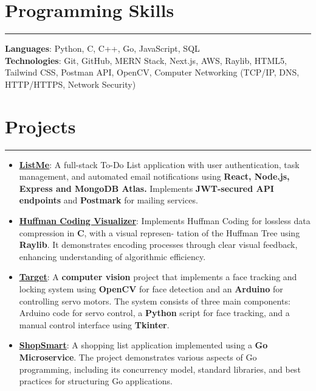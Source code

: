 \documentclass[a4paper,10.5pt]{article}
\begin{document}
\section*{Programming Skills}
\vspace{-.3em}
\hrule
\vspace{0.4em}

\textbf{Languages}: Python, C, C++, Go, JavaScript, SQL \vspace{0.3em} \\
\textbf{Technologies}: Git, GitHub, MERN Stack, Next.js, AWS, Raylib, HTML5, Tailwind CSS, Postman API, OpenCV, Computer Networking (TCP/IP, DNS, HTTP/HTTPS, Network Security) \vspace{0.3em}

\section*{Projects}
\vspace{-.3em}
\hrule
\vspace{0.4em}

\begin{itemize}
    \item \textbf{\href{https://github.com/thearfa99/mern}{\underline{ListMe}}}: A full-stack To-Do List application with user authentication, task management, and automated email notifications using \textbf{React, Node.js, Express and MongoDB Atlas.} Implements \textbf{JWT-secured API endpoints} and \textbf{Postmark} for mailing services.
    \item \textbf{\href{https://github.com/thearfa99/huft}{\underline{Huffman Coding Visualizer}}}: Implements Huffman Coding for lossless data compression in \textbf{C}, with a visual represen- tation of the Huffman Tree using \textbf{Raylib}. It demonstrates encoding processes through clear visual feedback, enhancing understanding of algorithmic efficiency.
    \item \textbf{\href{https://github.com/thearfa99/tureet}{\underline{Target}}}: A \textbf{computer vision} project that implements a face tracking and locking system using \textbf{OpenCV} for face detection and an \textbf{Arduino} for controlling servo motors. The system consists of three main components: Arduino code for servo control, a \textbf{Python} script for face tracking, and a manual control interface using \textbf{Tkinter}.
    \item \textbf{\href{https://github.com/thearfa99/ShopSmart}{\underline{ShopSmart}}}: A shopping list application implemented using a \textbf{Go Microservice}. The project demonstrates various aspects of Go programming, including its concurrency model, standard libraries, and best practices for structuring Go applications.
\end{itemize}
\end{document}
